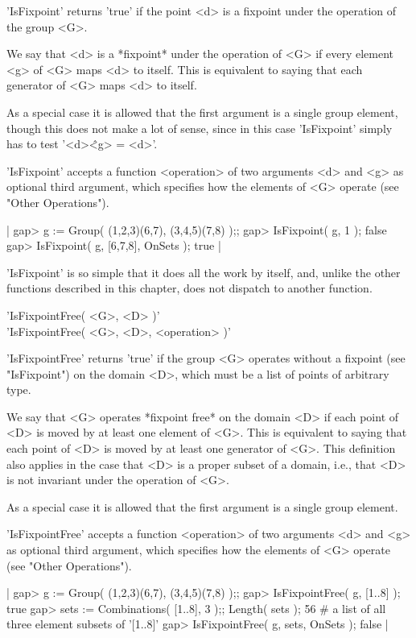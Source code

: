 'IsFixpoint'  returns  'true' if the point  <d>  is a  fixpoint under the
operation of the group <G>.

We say that  <d> is  a *fixpoint*  under the  operation of <G>  if  every
element <g> of <G> maps <d> to itself.  This is equivalent to saying that
each generator of <G> maps <d> to itself.

As a special case it is allowed that the first argument is a single group
element,  though this  does not make a  lot of sense, since in  this case
'IsFixpoint' simply has to test '<d>\^<g> = <d>'.

'IsFixpoint' accepts a function <operation> of two arguments <d>  and <g>
as optional  third  argument,  which specifies how  the  elements  of <G>
operate (see "Other Operations").

|    gap> g := Group( (1,2,3)(6,7), (3,4,5)(7,8) );;
    gap> IsFixpoint( g, 1 );
    false
    gap> IsFixpoint( g, [6,7,8], OnSets );
    true |

'IsFixpoint' is so simple that  it  does  all  the  work  by itself, and,
unlike the  other functions described in this chapter, does not  dispatch
to another function.


'IsFixpointFree( <G>, <D> )' \\
'IsFixpointFree( <G>, <D>, <operation> )'

'IsFixpointFree'  returns  'true'  if  the group  <G>  operates without a
fixpoint (see "IsFixpoint")  on the domain  <D>, which must be  a list of
points of arbitrary type.

We say that  <G> operates *fixpoint free* on the domain <D> if each point
of <D> is moved  by at least  one element of  <G>.  This is equivalent to
saying that each point of <D> is moved by at least one generator of  <G>.
This definition also applies in the case that <D> is a proper subset of a
domain, i.e., that <D> is not invariant under the operation of <G>.

As a special case it is allowed that the first argument is a single group
element.

'IsFixpointFree' accepts a function <operation> of two arguments <d>  and
<g> as optional third argument, which specifies how the  elements  of <G>
operate (see "Other Operations").

|    gap> g := Group( (1,2,3)(6,7), (3,4,5)(7,8) );;
    gap> IsFixpointFree( g, [1..8] );
    true
    gap> sets := Combinations( [1..8], 3 );;  Length( sets );
    56    # a list of all three element subsets of '[1..8]'
    gap> IsFixpointFree( g, sets, OnSets );
    false |

